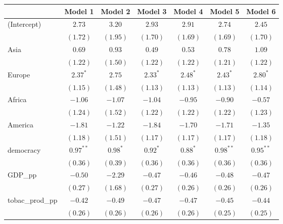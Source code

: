 
\begin{table}[!h]
\begin{center}
\begin{tabular}{l c c c c c c }
\toprule
 & Model 1 & Model 2 & Model 3 & Model 4 & Model 5 & Model 6 \\
\midrule
(Intercept)             & $2.73$      & $3.20$     & $2.93$      & $2.91$      & $2.74$      & $2.45$      \\
                        & $(1.72)$    & $(1.95)$   & $(1.70)$    & $(1.69)$    & $(1.69)$    & $(1.70)$    \\
Asia                    & $0.69$      & $0.93$     & $0.49$      & $0.53$      & $0.78$      & $1.09$      \\
                        & $(1.22)$    & $(1.50)$   & $(1.22)$    & $(1.22)$    & $(1.21)$    & $(1.22)$    \\
Europe                  & $2.37^{*}$  & $2.75$     & $2.33^{*}$  & $2.48^{*}$  & $2.43^{*}$  & $2.80^{*}$  \\
                        & $(1.15)$    & $(1.48)$   & $(1.13)$    & $(1.13)$    & $(1.13)$    & $(1.14)$    \\
Africa                  & $-1.06$     & $-1.07$    & $-1.04$     & $-0.95$     & $-0.90$     & $-0.57$     \\
                        & $(1.24)$    & $(1.52)$   & $(1.22)$    & $(1.22)$    & $(1.22)$    & $(1.23)$    \\
America                 & $-1.81$     & $-1.22$    & $-1.84$     & $-1.70$     & $-1.71$     & $-1.35$     \\
                        & $(1.18)$    & $(1.51)$   & $(1.17)$    & $(1.17)$    & $(1.17)$    & $(1.18)$    \\
democracy               & $0.97^{**}$ & $0.98^{*}$ & $0.92^{*}$  & $0.88^{*}$  & $0.98^{**}$ & $0.95^{**}$ \\
                        & $(0.36)$    & $(0.39)$   & $(0.36)$    & $(0.36)$    & $(0.36)$    & $(0.36)$    \\
GDP\_pp                 & $-0.50$     & $-2.29$    & $-0.47$     & $-0.46$     & $-0.48$     & $-0.47$     \\
                        & $(0.27)$    & $(1.68)$   & $(0.27)$    & $(0.26)$    & $(0.26)$    & $(0.26)$    \\
tobac\_prod\_pp         & $-0.42$     & $-0.49$    & $-0.47$     & $-0.47$     & $-0.45$     & $-0.44$     \\
                        & $(0.26)$    & $(0.26)$   & $(0.26)$    & $(0.26)$    & $(0.25)$    & $(0.25)$    \\

\end{tabular}
\end{center}
\end{table}
